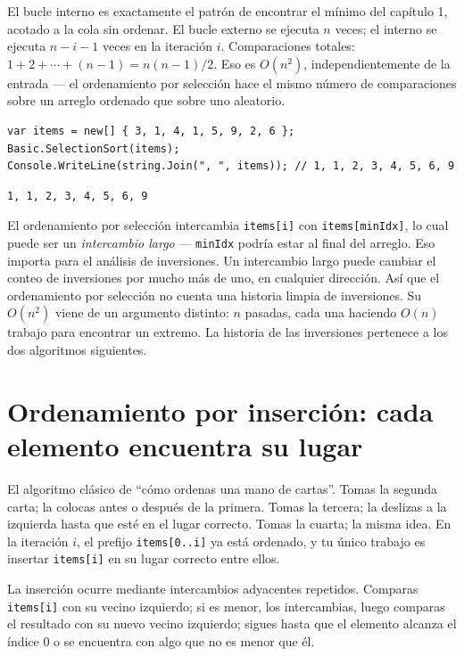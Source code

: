 \documentclass[11pt,a4paper]{article}
\begin{document}
El bucle interno es exactamente el patrón de encontrar el mínimo del capítulo 1, acotado a la cola sin ordenar. El bucle externo se ejecuta $n$ veces; el interno se ejecuta $n - i - 1$ veces en la iteración $i$. Comparaciones totales: $1 + 2 + \cdots + (n-1) = n(n-1)/2$. Eso es $O(n^2)$, independientemente de la entrada --- el ordenamiento por selección hace el mismo número de comparaciones sobre un arreglo ordenado que sobre uno aleatorio.

\begin{lstlisting}
var items = new[] { 3, 1, 4, 1, 5, 9, 2, 6 };
Basic.SelectionSort(items);
Console.WriteLine(string.Join(", ", items)); // 1, 1, 2, 3, 4, 5, 6, 9
\end{lstlisting}

\begin{verbatim}
1, 1, 2, 3, 4, 5, 6, 9
\end{verbatim}

El ordenamiento por selección intercambia \texttt{items[i]} con \texttt{items[minIdx]}, lo cual puede ser un \emph{intercambio largo} --- \texttt{minIdx} podría estar al final del arreglo. Eso importa para el análisis de inversiones. Un intercambio largo puede cambiar el conteo de inversiones por mucho más de uno, en cualquier dirección. Así que el ordenamiento por selección no cuenta una historia limpia de inversiones. Su $O(n^2)$ viene de un argumento distinto: $n$ pasadas, cada una haciendo $O(n)$ trabajo para encontrar un extremo. La historia de las inversiones pertenece a los dos algoritmos siguientes.

\section{Ordenamiento por inserción: cada elemento encuentra su lugar}

El algoritmo clásico de ``cómo ordenas una mano de cartas''. Tomas la segunda carta; la colocas antes o después de la primera. Tomas la tercera; la deslizas a la izquierda hasta que esté en el lugar correcto. Tomas la cuarta; la misma idea. En la iteración $i$, el prefijo \texttt{items[0..i]} ya está ordenado, y tu único trabajo es insertar \texttt{items[i]} en su lugar correcto entre ellos.

La inserción ocurre mediante intercambios adyacentes repetidos. Comparas \texttt{items[i]} con su vecino izquierdo; si es menor, los intercambias, luego comparas el resultado con su nuevo vecino izquierdo; sigues hasta que el elemento alcanza el índice 0 o se encuentra con algo que no es menor que él.
\end{document}
